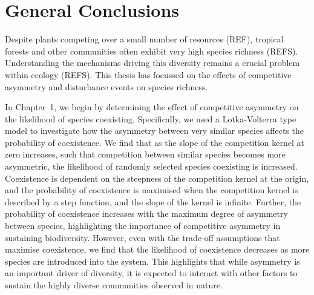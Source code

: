 

\section*{General Conclusions}
Despite plants competing over a small number of resources (REF), tropical forests and other communities often exhibit very high species richness (REFS). Understanding the mechanisms driving this diversity remains a crucial problem within ecology (REFS). This thesis has focussed on the effects of competitive asymmetry and disturbance events on species richness.

In Chapter~1, we begin by determining the effect of competitive asymmetry on the likelihood of species coexisting. Specifically, we used a Lotka-Volterra type model to investigate how the asymmetry between very similar species affects the probability of coexistence. We find that as the slope of the competition kernel at zero increases, such that competition between similar species becomes more asymmetric, the likelihood of randomly selected species coexisting is increased. Coexistence is dependent on the steepness of the competition kernel at the origin, and the probability of coexistence is maximised when the competition kernel is described by a step function, and the slope of the kernel is infinite. Further, the probability of coexistence increases with the maximum degree of asymmetry between species, highlighting the importance of competitive asymmetry in sustaining biodiversity. However, even with the trade-off assumptions that maximise coexistence, we find that the likelihood of coexistence decreases as more species are introduced into the system. This highlights that while asymmetry is an important driver of diversity, it is expected to interact with other factors to sustain the highly diverse communities observed in nature.

